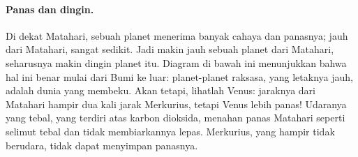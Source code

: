 \paragraph{Panas dan dingin.} Di dekat Matahari, sebuah planet menerima
banyak cahaya dan panasnya; jauh dari Matahari, sangat sedikit. Jadi makin
jauh sebuah planet dari Matahari, seharusnya makin dingin planet itu. Diagram
di bawah ini menunjukkan bahwa hal ini benar mulai dari Bumi ke luar:
planet-planet raksasa, yang letaknya jauh, adalah dunia yang membeku. Akan
tetapi, lihatlah Venus: jaraknya dari Matahari hampir dua kali jarak
Merkurius, tetapi Venus lebih panas! Udaranya yang tebal, yang terdiri atas
karbon dioksida, menahan panas Matahari seperti selimut tebal dan tidak
membiarkannya lepas. Merkurius, yang hampir tidak berudara, tidak dapat
menyimpan panasnya.

